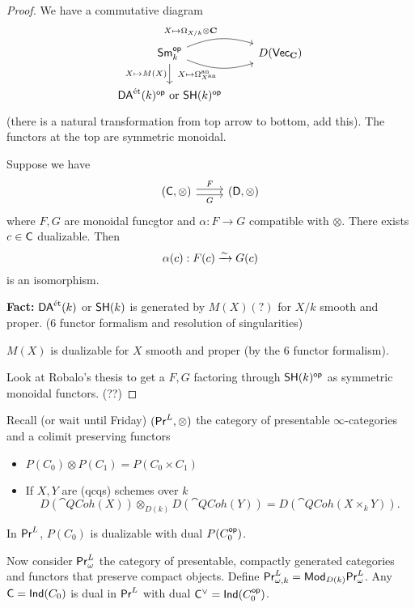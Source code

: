 \begin{proof}
	We have a commutative diagram
	\[
	\begin{tikzcd}
		\cat{Sm}_k\op \ar[r, bend left=20, "X\mapsto \Omega_{X /k}\otimes\bb{C}", name=F]
		\ar[r, bend right=20, "X\mapsto \Omega_{X\an}\an"', name=G] 
		\ar[d,"X\mapsto M(X)"'] 
		& D(\cat{Vec}_{\bb{C}}) 
		\\
		\DAet(k)\op\text{ or }\SH(k)\op
	\end{tikzcd}
	\]
	(there is a natural transformation from top arrow to bottom, add this). The functors at the top are symmetric monoidal.

	\begin{lemma}
		Suppose we have
		\begin{equation}
		\begin{tikzcd}
			(\C,\otimes) \ar[r,shift left,"F"] \ar[r,shift right,"G"'] & (\cat{D},\otimes)
		\end{tikzcd}
		\end{equation}
		where $F,G$ are monoidal funcgtor and $\alpha:F\to G$ compatible with $\otimes$. There exists $c\in \mathsf{C}$ dualizable. Then
		\[
		\alpha(c): F(c) \xrightarrow{\sim} G(c)
		\]
		is an isomorphism.
	\end{lemma}
	\textbf{Fact:} $\mathsf{DA}^\text{\'et}(k)$ or $\mathsf{SH}(k)$ is generated by $M(X)(?)$ for $X /k$ smooth and proper. (6 functor formalism and resolution of singularities)

	$M(X)$ is dualizable for $X$ smooth and proper (by the 6 functor formalism).

	Look at Robalo's thesis to get a $F,G$ factoring through $\mathsf{SH}(k)^\mathsf{op}$ as symmetric monoidal functors. (??)
\end{proof}
Recall (or wait until Friday) $(\mathsf{Pr}^L,\otimes)$ the category of presentable $\infty$-categories and a colimit preserving functors
\begin{itemize}
	\item $P(C_0)\otimes P(C_1) = P(C_0\times C_1)$ 
	\item If $X,Y$ are (qcqs) schemes over $k$
		\[
			D(\cat{QCoh}(X)) \otimes_{D(k)}D(\cat{QCoh}(Y)) = D(\cat{QCoh}(X\times_k Y)).
		\] 
\end{itemize}
\begin{example}
	In $\mathsf{Pr}^L$, $P(C_0)$ is dualizable with dual $P(C_0^\mathsf{op})$.
\end{example}

Now consider $\mathsf{Pr}^L_{\omega}$ the category of presentable, compactly generated categories and functors that preserve compact objects. Define $\mathsf{Pr}^L_{\omega,k} = \mathsf{Mod}_{D(k)}\mathsf{Pr}^L_\omega$. Any $\mathsf{C}=\mathsf{Ind}(C_0)$ is dual in $\mathsf{Pr}^L$ with dual $\mathsf{C}^{\vee}=\mathsf{Ind}(C_0^\mathsf{op})$.

